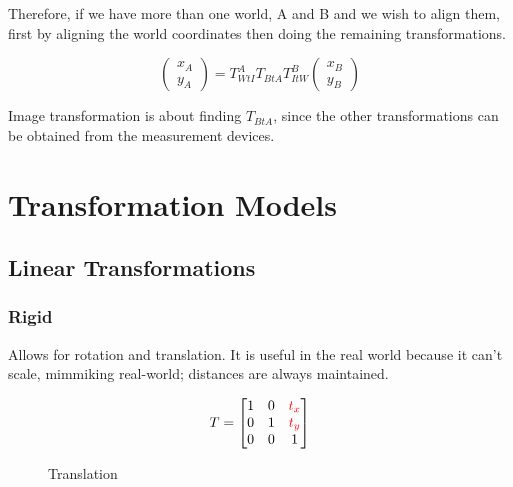 \documentclass[11pt]{article}
\begin{document}
Therefore, if we have more than one world, A and B and we wish to align them, first by aligning the world coordinates then doing the remaining transformations.

\begin{equation*}
    \begin{pmatrix}
        x_A \\ y_A
    \end{pmatrix}
    =
    T^A_{WtI} T_{BtA} T^B_{ItW}
    \begin{pmatrix}
        x_B \\ y_B
    \end{pmatrix}
\end{equation*}

Image transformation is about finding $T_{BtA}$, since the other transformations can be obtained from the measurement devices.

\section{Transformation Models}

\begin{figure}[H]
    \centering
    \label{fig:transformation-models}
\end{figure}

\subsection{Linear Transformations}

\subsubsection{Rigid}

Allows for rotation and translation. It is useful in the real world because it can't scale, mimmiking real-world; distances are always maintained. 

\begin{minipage}[c]{0.5\linewidth}
    \begin{equation*}
        T= \begin{bmatrix}
            1 & 0 & \color{red}t_x \\ 
            0 & 1 & \color{red}t_y \\ 
            0 & 0 & 1
        \end{bmatrix}
    \end{equation*}
\end{minipage}\hfill
\begin{minipage}[c]{0.5\linewidth}
    \begin{figure}[H]
        \centering
        \caption*{Translation}
    \end{figure}
\end{minipage}
\end{document}
